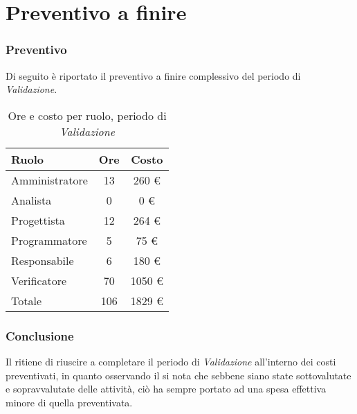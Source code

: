\section{Preventivo a finire}
\subsubsection{Preventivo}
Di seguito \`e riportato il preventivo a finire complessivo del periodo di \textit{Validazione}.

\begin{table}[H]
	\centering
	\begin{tabular}{ l c c }
		\textbf{Ruolo} & \textbf{Ore} & \textbf{Costo} \\
		\hline
		Amministratore & 13 & 260 \euro{} \\
		Analista & 0 & 0 \euro{} \\
		Progettista & 12 & 264 \euro{} \\
		Programmatore & 5 & 75 \euro{} \\
		Responsabile & 6 & 180 \euro{} \\
		Verificatore & 70 & 1050 \euro{} \\
		\hline
		Totale & 106 & 1829 \euro{} \\
		\hline
	\end{tabular}
	\caption{Ore e costo per ruolo, periodo di \textit{Validazione}}
\end{table}


\subsubsection{Conclusione}
Il  ritiene di riuscire a completare il periodo di \textit{Validazione} all'interno dei costi preventivati, in quanto osservando il  si nota che sebbene siano state sottovalutate e sopravvalutate delle attivit\`a, ci\`o ha sempre portato ad una spesa effettiva minore di quella preventivata.

\newpage